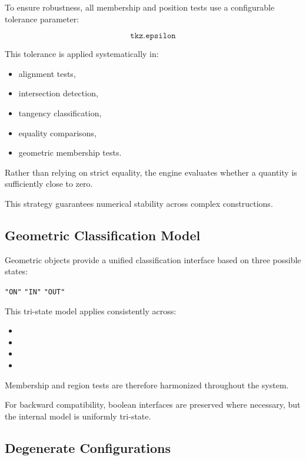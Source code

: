 To ensure robustness, all membership and position tests use a configurable
tolerance parameter:

\[
\texttt{tkz.epsilon}
\]

This tolerance is applied systematically in:

\begin{itemize}
\item alignment tests,
\item intersection detection,
\item tangency classification,
\item equality comparisons,
\item geometric membership tests.
\end{itemize}

Rather than relying on strict equality, the engine evaluates whether
a quantity is sufficiently close to zero.

This strategy guarantees numerical stability across complex constructions.

\subsection{Geometric Classification Model}


Geometric objects provide a unified classification interface based on
three possible states:

\begin{center}
\texttt{"ON"} \quad \texttt{"IN"} \quad \texttt{"OUT"}
\end{center}

This tri-state model applies consistently across:

\begin{itemize}
\item {}
\item {}
\item {}
\item {}
\end{itemize}

Membership and region tests are therefore harmonized throughout the system.

For backward compatibility, boolean interfaces are preserved where necessary,
but the internal model is uniformly tri-state.

\subsection{Degenerate Configurations}


